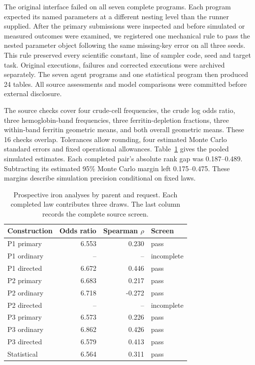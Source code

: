 The original interface failed on all seven complete programs. Each program expected its named parameters at a different nesting level than the runner supplied. After the primary submissions were inspected and before simulated or measured outcomes were examined, we registered one mechanical rule to pass the nested parameter object following the same missing-key error on all three seeds. This rule preserved every scientific constant, line of sampler code, seed and target task. Original executions, failures and corrected executions were archived separately. The seven agent programs and one statistical program then produced 24 tables. All source assessments and model comparisons were committed before external disclosure.

The source checks cover four crude-cell frequencies, the crude log odds ratio, three hemoglobin-band frequencies, three ferritin-depletion fractions, three within-band ferritin geometric means, and both overall geometric means. These 16 checks overlap. Tolerances allow rounding, four estimated Monte Carlo standard errors and fixed operational allowances. Table~\ref{tab:ironprospective} gives the pooled simulated estimates. Each completed pair's absolute rank gap was 0.187--0.489. Subtracting its estimated 95\% Monte Carlo margin left 0.175--0.475. These margins describe simulation precision conditional on fixed laws.

\begin{table}[H]
\caption{Prospective iron analyses by parent and request. Each completed law contributes three draws. The last column records the complete source screen.}
\label{tab:ironprospective}
\centering
\begin{tabular}{@{}lrrl@{}}
\toprule
Construction & Odds ratio & Spearman $\rho$ & Screen\\
\midrule
P1 primary & 6.553 & 0.230 & pass\\
P1 ordinary & -- & -- & incomplete\\
P1 directed & 6.672 & 0.446 & pass\\
P2 primary & 6.683 & 0.217 & pass\\
P2 ordinary & 6.718 & -0.272 & pass\\
P2 directed & -- & -- & incomplete\\
P3 primary & 6.573 & 0.226 & pass\\
P3 ordinary & 6.862 & 0.426 & pass\\
P3 directed & 6.579 & 0.413 & pass\\
Statistical & 6.564 & 0.311 & pass\\
\bottomrule
\end{tabular}
\end{table}

